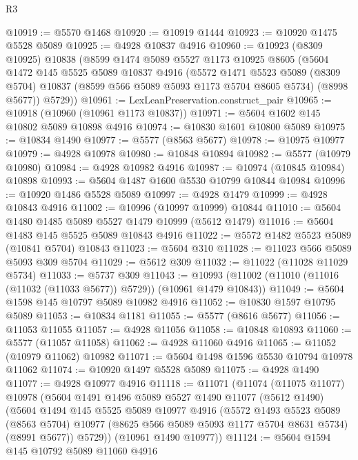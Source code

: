 \begin{lexlean}{R3}
\begin{coremodule}
@10919 := @5570 @1468
@10920 := @10919 @1444
@10923 := @10920 @1475 @5528 @5089
@10925 := @4928 @10837 @4916
@10960 := @10923
    (@8309 @10925)
    @10838
    (@8599
      @1474
      @5089
      @5527
      @1173
      @10925
      @8605
      (@5604
        @1472
        @145
        @5525
        @5089
        @10837
        @4916
        (@5572
          @1471
          @5523
          @5089
          (@8309 @5704)
          @10837
          (@8599 @566 @5089 @5093 @1173 @5704 @8605 @5734)
          (@8998 @5677))
        @5729))
@10961 := LexLeanPreservation.construct_pair
@10965 := @10918 (@10960 (@10961 @1173 @10837))
@10971 := @5604 @1602 @145 @10802 @5089 @10898 @4916
@10974 := @10830 @1601 @10800 @5089
@10975 := @10834 @1490
@10977 := @5577 (@8563 @5677)
@10978 := @10975 @10977
@10979 := @4928 @10978
@10980 := @10848 @10894
@10982 := @5577 (@10979 @10980)
@10984 := @4928 @10982 @4916
@10987 := @10974 (@10845 @10984) @10898
@10993 := @5604 @1487 @1600 @5530 @10799 @10844 @10984
@10996 := @10920 @1486 @5528 @5089
@10997 := @4928 @1479
@10999 := @4928 @10843 @4916
@11002 := @10996 (@10997 @10999) @10844
@11010 := @5604 @1480 @1485 @5089 @5527 @1479 @10999 (@5612 @1479)
@11016 := @5604 @1483 @145 @5525 @5089 @10843 @4916
@11022 := @5572 @1482 @5523 @5089 (@10841 @5704) @10843
@11023 := @5604 @310
@11028 := @11023 @566 @5089 @5093 @309 @5704
@11029 := @5612 @309
@11032 := @11022 (@11028 @11029 @5734)
@11033 := @5737 @309
@11043 := @10993 (@11002 (@11010 (@11016 (@11032 (@11033 @5677)) @5729)) (@10961 @1479 @10843))
@11049 := @5604 @1598 @145 @10797 @5089 @10982 @4916
@11052 := @10830 @1597 @10795 @5089
@11053 := @10834 @1181
@11055 := @5577 (@8616 @5677)
@11056 := @11053 @11055
@11057 := @4928 @11056
@11058 := @10848 @10893
@11060 := @5577 (@11057 @11058)
@11062 := @4928 @11060 @4916
@11065 := @11052 (@10979 @11062) @10982
@11071 := @5604 @1498 @1596 @5530 @10794 @10978 @11062
@11074 := @10920 @1497 @5528 @5089
@11075 := @4928 @1490
@11077 := @4928 @10977 @4916
@11118 := @11071
    (@11074
      (@11075 @11077)
      @10978
      (@5604
        @1491
        @1496
        @5089
        @5527
        @1490
        @11077
        (@5612 @1490)
        (@5604
          @1494
          @145
          @5525
          @5089
          @10977
          @4916
          (@5572
            @1493
            @5523
            @5089
            (@8563 @5704)
            @10977
            (@8625 @566 @5089 @5093 @1177 @5704 @8631 @5734)
            (@8991 @5677))
          @5729))
      (@10961 @1490 @10977))
@11124 := @5604 @1594 @145 @10792 @5089 @11060 @4916

\end{coremodule}
\end{lexlean}
